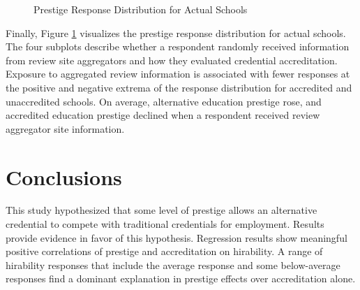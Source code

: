 \documentclass[review]{elsarticle}
\begin{document}
\begin{figure}[h!]
    \centering
    \caption{Prestige Response Distribution for Actual Schools}
    \label{fig:var_results}
\end{figure}

Finally, Figure \ref{fig:var_results} visualizes the prestige response distribution
for actual schools.
The four subplots describe whether a respondent randomly received information from review site aggregators
and how they evaluated credential accreditation.
Exposure to aggregated review information is associated with fewer responses at the positive
and negative extrema of the response distribution for accredited and unaccredited schools.
On average, alternative education prestige rose,
and accredited education prestige declined when a respondent received review aggregator site information.

\section{Conclusions}

This study hypothesized that some level of prestige allows an alternative credential to compete with traditional credentials for employment.
Results provide evidence in favor of this hypothesis.
Regression results show meaningful positive correlations of prestige and accreditation on hirability.
A range of hirability responses that include the average response and some below-average responses
find a dominant explanation in prestige effects over accreditation alone.
\end{document}
